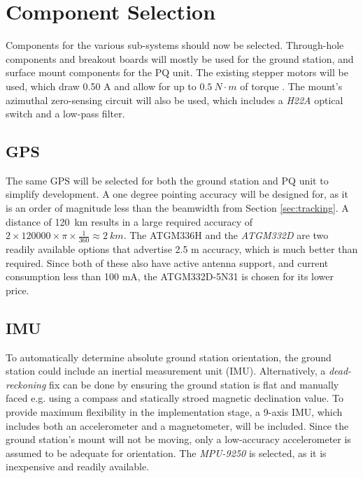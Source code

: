 \graphicspath{{./figures}}

\section{Component Selection}
Components for the various sub-systems should now be selected. Through-hole components and breakout boards will mostly be used for the ground station, and surface mount components for the PQ unit. The existing stepper motors will be used, which draw 0.50 A and allow for up to $\SI{0.5}{N \cdot m}$ of torque \cite{datasheet-4118}. The mount's azimuthal zero-sensing circuit will also be used, which includes a \textit{H22A} optical switch and a low-pass filter.

\subsection{GPS}\label{sec:components_gps}
The same GPS will be selected for both the ground station and PQ unit to simplify development. A one degree pointing accuracy will be designed for, as it is an order of magnitude less than the beamwidth from Section \ref{sec:tracking}. A distance of \SI{120}{km} results in a large required accuracy of $2 \times 120 000 \times \pi \times \frac{1}{360} \approx \SI{2}{km}$. The {ATGM336H} and the \textit{ATGM332D} are two readily available options that advertise 2.5 m accuracy, which is much better than required. Since both of these also have active antenna support, and current consumption less than 100 mA, the ATGM332D-5N31 is chosen for its lower price.

\subsection{IMU}
To automatically determine absolute ground station orientation, the ground station could include an inertial measurement unit (IMU). Alternatively, a \textit{dead-reckoning} fix can be done by ensuring the ground station is flat and manually faced e.g. using a compass and statically stroed magnetic declination value. To provide maximum flexibility in the implementation stage, a 9-axis IMU, which includes both an accelerometer and a magnetometer, will be included. Since the ground station's mount will not be moving, only a low-accuracy accelerometer is assumed to be adequate for orientation. The \textit{MPU-9250} is selected, as it is inexpensive and readily available.

